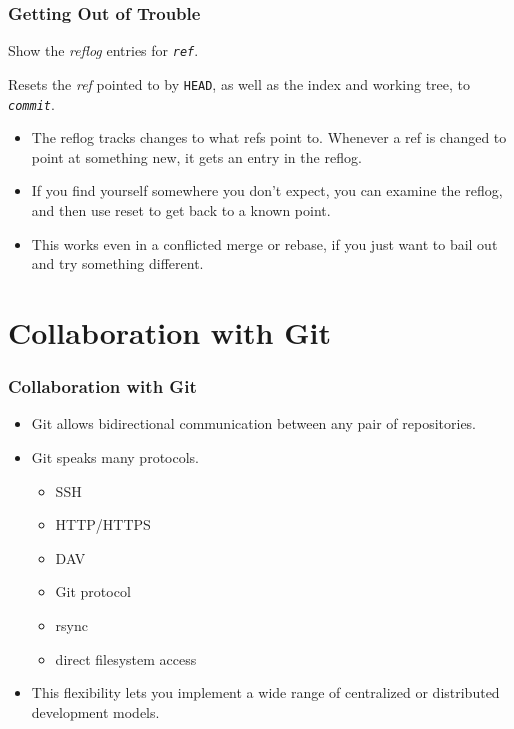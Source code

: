 \documentclass{beamer}
\begin{document}
\begin{frame}
  \frametitle{Getting Out of Trouble}
  \begin{description}
  \item[\texttt{git log -g \textit{ref}}] Show the \emph{reflog}
    entries for \texttt{\textit{ref}}.
  \item[\texttt{git reset --hard \textit{commit}}] Resets the
    \emph{ref} pointed to by \texttt{HEAD}, as well as the index and
    working tree, to \texttt{\textit{commit}}.
  \end{description}

  \begin{itemize}
  \item The reflog tracks changes to what refs point to. Whenever a
    ref is changed to point at something new, it gets an entry in the
    reflog.
  \item If you find yourself somewhere you don't expect, you can
    examine the reflog, and then use reset to get back to a known
    point.
  \item This works even in a conflicted merge or rebase, if you just
    want to bail out and try something different.
  \end{itemize}

\end{frame}

\section{Collaboration with Git}

\begin{frame}
  \frametitle{Collaboration with Git}
  \begin{itemize}
  \item Git allows bidirectional communication between any pair of
    repositories.
  \item Git speaks many protocols.
    \begin{itemize}
    \item SSH
    \item HTTP/HTTPS
    \item DAV
    \item Git protocol
    \item rsync
    \item direct filesystem access
    \end{itemize}
  \item This flexibility lets you implement a wide range of
    centralized or distributed development models.
  \end{itemize}
\end{frame}
\end{document}

